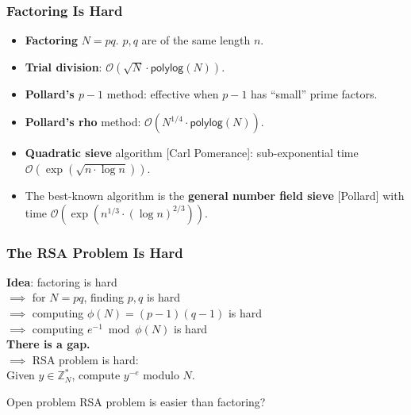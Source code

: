 \begin{frame}\frametitle{Factoring Is Hard}
\begin{itemize}
\item \textbf{Factoring} $N=pq$. $p,q$ are of the same length $n$.
\item \textbf{Trial division}: $\mathcal{O}(\sqrt{N}\cdot \mathsf{polylog}(N))$.
\item \textbf{Pollard's $p-1$} method: effective when $p-1$ has ``small'' prime factors.
\item \textbf{Pollard's rho} method: $\mathcal{O}(N^{1/4}\cdot \mathsf{polylog}(N))$.
\item \textbf{Quadratic sieve} algorithm [Carl Pomerance]: sub-exponential time $\mathcal{O}(\exp(\sqrt{n\cdot \log n}))$.
\item The best-known algorithm is the \textbf{general number field sieve} [Pollard] with time $\mathcal{O}(\exp(n^{1/3}\cdot(\log n)^{2/3}))$.
\end{itemize}
\end{frame}
\begin{frame}\frametitle{The RSA Problem Is Hard}
\textbf{Idea}: factoring is hard\\ $\implies$ for $N=pq$, finding $p,q$ is hard\\ $\implies$ computing $\phi(N)=(p-1)(q-1)$ is hard\\ 
$\implies$ computing $e^{-1} \bmod \phi(N)$ is hard\\
\alert{\textbf{There is a gap.}}\\
$\implies$ RSA problem is hard:\\
Given $y \in \mathbb{Z}^*_N$, compute $y^{-e}$ modulo $N$.
\begin{alertblock}{Open problem}
RSA problem is easier than factoring?
\end{alertblock}
\end{frame}
